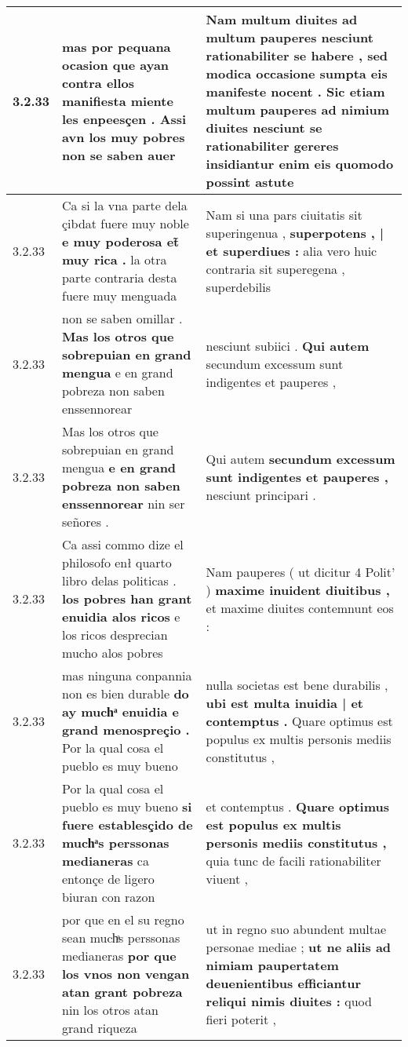 \begin{tabular}{|p{1cm}|p{6.5cm}|p{6.5cm}|}
3.2.33 & mas por pequana ocasion \textbf{ que ayan contra ellos manifiesta miente les enpeesçen . } Assi avn los muy pobres non se saben auer & Nam multum diuites ad multum pauperes nesciunt rationabiliter se habere , \textbf{ sed modica occasione sumpta eis manifeste nocent . Sic etiam multum pauperes ad nimium diuites nesciunt } se rationabiliter gereres insidiantur enim eis quomodo possint astute \\\hline
3.2.33 & Ca si la vna parte dela çibdat fuere muy noble \textbf{ e muy poderosa et̃ muy rica . } la otra parte contraria desta fuere muy menguada & Nam si una pars ciuitatis sit superingenua , \textbf{ superpotens , | et superdiues : } alia vero huic contraria sit superegena , superdebilis \\\hline
3.2.33 & non se saben omillar . \textbf{ Mas los otros que sobrepuian en grand mengua } e en grand pobreza non saben enssennorear & nesciunt subiici . \textbf{ Qui autem } secundum excessum sunt indigentes et pauperes , \\\hline
3.2.33 & Mas los otros que sobrepuian en grand mengua \textbf{ e en grand pobreza non saben enssennorear } nin ser señores . & Qui autem \textbf{ secundum excessum sunt indigentes et pauperes , } nesciunt principari . \\\hline
3.2.33 & Ca assi commo dize el philosofo enł quarto libro delas politicas . \textbf{ los pobres han grant enuidia alos ricos } e los ricos desprecian mucho alos pobres & Nam pauperes ( ut dicitur 4 Polit’ ) \textbf{ maxime inuident diuitibus , } et maxime diuites contemnunt eos : \\\hline
3.2.33 & mas ninguna conpannia non es bien durable \textbf{ do ay muchͣ enuidia e grand menospreçio . } Por la qual cosa el pueblo es muy bueno & nulla societas est bene durabilis , \textbf{ ubi est multa inuidia | et contemptus . } Quare optimus est populus ex multis personis mediis constitutus , \\\hline
3.2.33 & Por la qual cosa el pueblo es muy bueno \textbf{ si fuere establesçido de muchͣs perssonas medianeras } ca entonçe de ligero biuran con razon & et contemptus . \textbf{ Quare optimus est populus ex multis personis mediis constitutus , } quia tunc de facili rationabiliter viuent , \\\hline
3.2.33 & por que en el su regno sean muchͣs perssonas medianeras \textbf{ por que los vnos non vengan atan grant pobreza } nin los otros atan grand riqueza & ut in regno suo abundent multae personae mediae ; \textbf{ ut ne aliis ad nimiam paupertatem deuenientibus efficiantur reliqui nimis diuites : } quod fieri poterit , \\\hline

\end{tabular}

